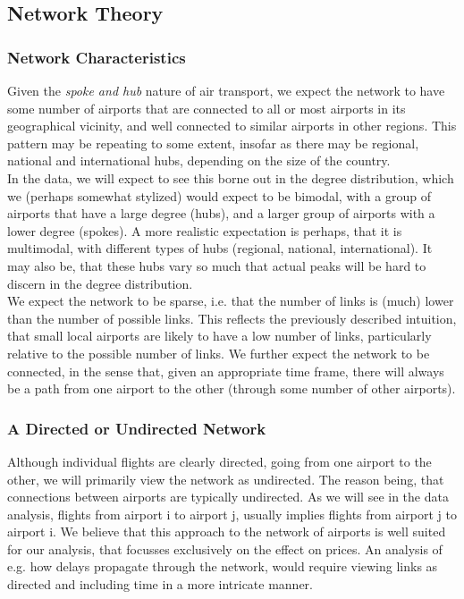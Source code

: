\subsection{Network Theory}
\label{subsec:Network Theory}

\subsubsection{Network Characteristics}
Given the \textit{spoke and hub} nature of air transport, we expect the network to have some number of airports that are connected to all or most airports in its geographical vicinity, and well connected to similar airports in other regions. This pattern may be repeating to some extent, insofar as there may be regional, national and international hubs, depending on the size of the country. \\ \medskip
In the data, we will expect to see this borne out in the degree distribution, which we (perhaps somewhat stylized) would expect to be bimodal, with a group of airports that have a large degree (hubs), and a larger group of airports with a lower degree (spokes). A more realistic expectation is perhaps, that it is multimodal, with different types of hubs (regional, national, international). It may also be, that these hubs vary so much that actual peaks will be hard to discern in the degree distribution. \\
\medskip
We expect the network to be sparse, i.e. that the number of links is (much) lower than the number of possible links. This reflects the previously described intuition, that small local airports are likely to have a low number of links, particularly relative to the possible number of links. We further expect the network to be connected, in the sense that, given an appropriate time frame, there will always be a path from one airport to the other (through some number of other airports). 

\subsubsection{A Directed or Undirected Network}
Although individual flights are clearly directed, going from one airport to the other, we will primarily view the network as undirected. The reason being, that connections between airports are typically undirected. 
As we will see in the data analysis, flights from airport i to airport j, usually implies flights from airport j to airport i. We believe that this approach to the network of airports is well suited for our analysis, that focusses exclusively on the effect on prices. An analysis of e.g. how delays propagate through the network, would require viewing links as directed and including time in a more intricate manner.\\

